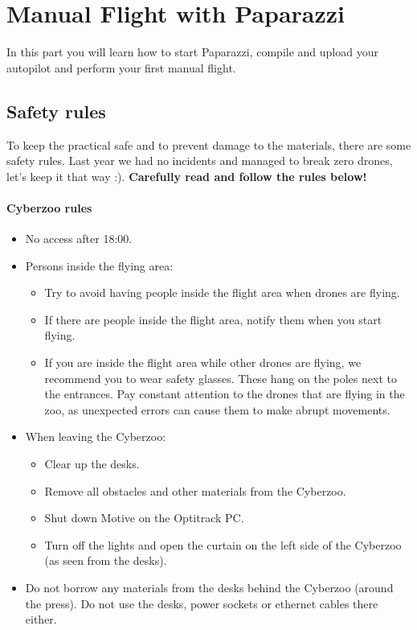 \chapter{Manual Flight with Paparazzi}
\label{ch:manual_flight}
In this part you will learn how to start Paparazzi, compile and upload your autopilot and perform your first manual flight.

\section{Safety rules}
To keep the practical safe and to prevent damage to the materials, there are some safety rules.
Last year we had no incidents and managed to break zero drones, let's keep it that way :).
\textbf{Carefully read and follow the rules below!}

\subsubsection*{Cyberzoo rules}
\begin{itemize}
	\item No access after 18:00.
	\item Persons inside the flying area:
	\begin{itemize}
		\item Try to avoid having people inside the flight area when drones are flying.
		\item If there are people inside the flight area, notify them when you start flying.
		\item If you are inside the flight area while other drones are flying, we recommend you to wear safety glasses. These hang on the poles next to the entrances. Pay constant attention to the drones that are flying in the zoo, as unexpected errors can cause them to make abrupt movements.
	\end{itemize}
	\item When leaving the Cyberzoo:
	\begin{itemize}
		\item Clear up the desks.
		\item Remove all obstacles and other materials from the Cyberzoo.
		\item Shut down Motive on the Optitrack PC.
		\item Turn off the lights and open the curtain on the left side of the Cyberzoo (as seen from the desks).
	\end{itemize}
	\item Do not borrow any materials from the desks behind the Cyberzoo (around the press). Do not use the desks, power sockets or ethernet cables there either.
\end{itemize}

